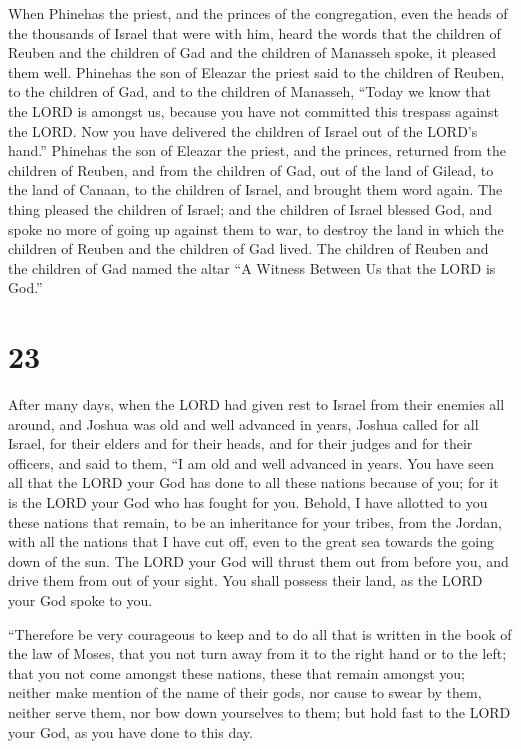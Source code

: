  When Phinehas the priest, and the princes of the
congregation, even the heads of the thousands of Israel that were with
him, heard the words that the children of Reuben and the children of Gad
and the children of Manasseh spoke, it pleased them well.
 Phinehas the son of Eleazar the priest said to the
children of Reuben, to the children of Gad, and to the children of
Manasseh, ``Today we know that the LORD is amongst us, because you have
not committed this trespass against the LORD. Now you have delivered the
children of Israel out of the LORD's hand.''  Phinehas
the son of Eleazar the priest, and the princes, returned from the
children of Reuben, and from the children of Gad, out of the land of
Gilead, to the land of Canaan, to the children of Israel, and brought
them word again.  The thing pleased the children of
Israel; and the children of Israel blessed God, and spoke no more of
going up against them to war, to destroy the land in which the children
of Reuben and the children of Gad lived.  The children of
Reuben and the children of Gad named the altar ``A Witness Between Us
that the LORD is God.''

\hypertarget{section-22}{%
\section{23}\label{section-22}}

 After many days, when the LORD had given rest to Israel
from their enemies all around, and Joshua was old and well advanced in
years,  Joshua called for all Israel, for their elders and
for their heads, and for their judges and for their officers, and said
to them, ``I am old and well advanced in years.  You have
seen all that the LORD your God has done to all these nations because of
you; for it is the LORD your God who has fought for you. 
Behold, I have allotted to you these nations that remain, to be an
inheritance for your tribes, from the Jordan, with all the nations that
I have cut off, even to the great sea towards the going down of the sun.
 The LORD your God will thrust them out from before you,
and drive them from out of your sight. You shall possess their land, as
the LORD your God spoke to you.

 ``Therefore be very courageous to keep and to do all that
is written in the book of the law of Moses, that you not turn away from
it to the right hand or to the left;  that you not come
amongst these nations, these that remain amongst you; neither make
mention of the name of their gods, nor cause to swear by them, neither
serve them, nor bow down yourselves to them;  but hold
fast to the LORD your God, as you have done to this day.

